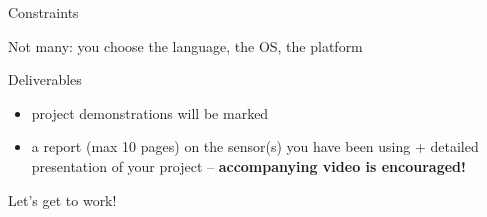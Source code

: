 \documentclass[compress]{beamer}
\providecommand{\tightlist}{%
  \setlength{\itemsep}{0pt}\setlength{\parskip}{0pt}}
\begin{document}
\begin{frame}{Constraints}

Not many: you choose the language, the OS, the platform

\end{frame}

\begin{frame}{Deliverables}

\begin{itemize}
\tightlist
\item
  project demonstrations will be marked
\item
  a report (max 10 pages) on the sensor(s) you have been using +
  detailed presentation of your project -- \textbf{accompanying video is
  encouraged!}
\end{itemize}

\end{frame}


\begin{frame}{}
    \begin{center}
        \Large
        Let's get to work!\\[2em]

    \end{center}
\end{frame}
\end{document}

